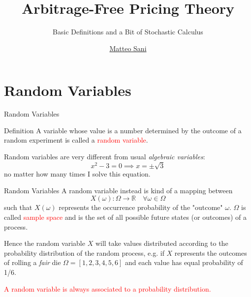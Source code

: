 \documentclass{beamer}
\title{Arbitrage-Free Pricing Theory}
\subtitle{Basic Definitions and a Bit of Stochastic Calculus}
\author{\href{mailto:matteo.sani@unisi.it}{Matteo Sani}}
\begin{document}
	\begin{frame}[plain]
		\maketitle
	\end{frame}


\section{Random Variables}
\begin{frame}{Random Variables}
	\begin{block}{Definition}
	A variable whose value is a number determined by the outcome of a random experiment is called a \textcolor{red}{random variable}.
	\end{block}
	\vspace{0.5 cm}
        
	\pause
	Random variables are very different from usual \emph{algebraic variables}:
\begin{equation*}
	x^2 - 3 = 0 \implies x = \pm \sqrt{3}
\end{equation*}	
	no matter how many times I solve this equation.
\end{frame}

\begin{frame}{Random Variables}
	A random variable instead is kind of a mapping between 
	\begin{equation*}
		X(\omega):\Omega\rightarrow \mathbb{R}\quad \forall\omega\in\Omega
	\end{equation*}
	such that $X(\omega)$ represents the occurrence probability of the "outcome" $\omega$. $\Omega$ is called \textcolor{red}{sample space} and is the set of all possible future states (or outcomes) of a process.
	\pause
	\vspace{0.5cm}
        
	Hence the random variable $X$ will take values distributed according to the probability distribution of the random process, e.g. if $X$ represents the outcomes of rolling a \emph{fair} die $\Omega = [1,2,3,4,5,6]$ and each value has equal probability of 1/6.
	\vspace{0.5cm}
        
	\textcolor{red}{A random variable is always associated to a probability distribution.}
\end{frame}
\end{document}

